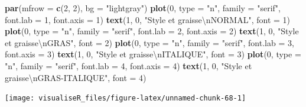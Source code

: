 \documentclass[]{article}
\newenvironment{Shaded}{\begin{snugshade}}{\end{snugshade}}
\newcommand{\CharTok}[1]{\textcolor[rgb]{0.31,0.60,0.02}{#1}}
\newcommand{\DataTypeTok}[1]{\textcolor[rgb]{0.13,0.29,0.53}{#1}}
\newcommand{\DecValTok}[1]{\textcolor[rgb]{0.00,0.00,0.81}{#1}}
\newcommand{\KeywordTok}[1]{\textcolor[rgb]{0.13,0.29,0.53}{\textbf{#1}}}
\newcommand{\NormalTok}[1]{#1}
\newcommand{\StringTok}[1]{\textcolor[rgb]{0.31,0.60,0.02}{#1}}
\begin{document}
\begin{Shaded}
\begin{Highlighting}[]
\KeywordTok{par}\NormalTok{(}\DataTypeTok{mfrow =} \KeywordTok{c}\NormalTok{(}\DecValTok{2}\NormalTok{, }\DecValTok{2}\NormalTok{), }\DataTypeTok{bg =} \StringTok{"lightgray"}\NormalTok{)}
\KeywordTok{plot}\NormalTok{(}\DecValTok{0}\NormalTok{, }\DataTypeTok{type =} \StringTok{"n"}\NormalTok{, }\DataTypeTok{family =} \StringTok{"serif"}\NormalTok{, }\DataTypeTok{font.lab =} \DecValTok{1}\NormalTok{, }\DataTypeTok{font.axis =} \DecValTok{1}\NormalTok{)}
\KeywordTok{text}\NormalTok{(}\DecValTok{1}\NormalTok{, }\DecValTok{0}\NormalTok{, }\StringTok{"Style et graisse}\CharTok{\textbackslash{}n}\StringTok{NORMAL"}\NormalTok{, }\DataTypeTok{font =} \DecValTok{1}\NormalTok{)}
\KeywordTok{plot}\NormalTok{(}\DecValTok{0}\NormalTok{, }\DataTypeTok{type =} \StringTok{"n"}\NormalTok{, }\DataTypeTok{family =} \StringTok{"serif"}\NormalTok{, }\DataTypeTok{font.lab =} \DecValTok{2}\NormalTok{, }\DataTypeTok{font.axis =} \DecValTok{2}\NormalTok{)}
\KeywordTok{text}\NormalTok{(}\DecValTok{1}\NormalTok{, }\DecValTok{0}\NormalTok{, }\StringTok{"Style et graisse}\CharTok{\textbackslash{}n}\StringTok{GRAS"}\NormalTok{, }\DataTypeTok{font =} \DecValTok{2}\NormalTok{)}
\KeywordTok{plot}\NormalTok{(}\DecValTok{0}\NormalTok{, }\DataTypeTok{type =} \StringTok{"n"}\NormalTok{, }\DataTypeTok{family =} \StringTok{"serif"}\NormalTok{, }\DataTypeTok{font.lab =} \DecValTok{3}\NormalTok{, }\DataTypeTok{font.axis =} \DecValTok{3}\NormalTok{)}
\KeywordTok{text}\NormalTok{(}\DecValTok{1}\NormalTok{, }\DecValTok{0}\NormalTok{, }\StringTok{"Style et graisse}\CharTok{\textbackslash{}n}\StringTok{ITALIQUE"}\NormalTok{, }\DataTypeTok{font =} \DecValTok{3}\NormalTok{)}
\KeywordTok{plot}\NormalTok{(}\DecValTok{0}\NormalTok{, }\DataTypeTok{type =} \StringTok{"n"}\NormalTok{, }\DataTypeTok{family =} \StringTok{"serif"}\NormalTok{, }\DataTypeTok{font.lab =} \DecValTok{4}\NormalTok{, }\DataTypeTok{font.axis =} \DecValTok{4}\NormalTok{)}
\KeywordTok{text}\NormalTok{(}\DecValTok{1}\NormalTok{, }\DecValTok{0}\NormalTok{, }\StringTok{"Style et graisse}\CharTok{\textbackslash{}n}\StringTok{GRAS-ITALIQUE"}\NormalTok{, }\DataTypeTok{font =} \DecValTok{4}\NormalTok{)}
\end{Highlighting}
\end{Shaded}

\begin{center}\texttt{[image: visualiseR\_files/figure-latex/unnamed-chunk-68-1]} \end{center}
\end{document}
